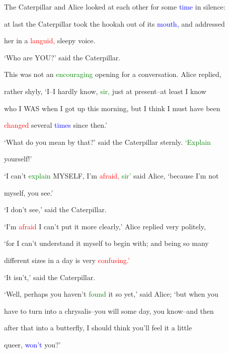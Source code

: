 The Caterpillar and Alice looked at each other for some \textcolor{blue}{time} in silence:

 at last the Caterpillar took the hookah out of its \textcolor{blue}{mouth,} and addressed

 her in a \textcolor{red}{languid,} sleepy voice.



 ‘Who are YOU?’ said the Caterpillar.



 This was not an \textcolor{green}{encouraging} opening for a conversation. Alice replied,

 rather shyly, ‘I--I hardly know, \textcolor{green}{sir,} just at present--at least I know

 who I WAS when I got up this morning, but I think I must have been

 \textcolor{red}{changed} several \textcolor{blue}{times} since then.’



 ‘What do you mean by that?’ said the Caterpillar sternly. \textcolor{green}{‘Explain}

 yourself!’



 ‘I can’t \textcolor{green}{explain} MYSELF, I’m \textcolor{red}{afraid,} \textcolor{green}{sir’} said Alice, ‘because I’m not

 myself, you see.’



 ‘I don’t see,’ said the Caterpillar.



 ‘I’m \textcolor{red}{afraid} I can’t put it more clearly,’ Alice replied very politely,

 ‘for I can’t understand it myself to begin with; and being so many

 different sizes in a day is very \textcolor{red}{confusing.’}



 ‘It isn’t,’ said the Caterpillar.



 ‘Well, perhaps you haven’t \textcolor{green}{found} it so yet,’ said Alice; ‘but when you

 have to turn into a chrysalis--you will some day, you know--and then

 after that into a butterfly, I should think you’ll feel it a little

 queer, \textcolor{blue}{won’t} you?’



